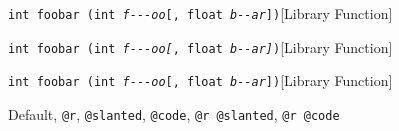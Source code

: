 \documentclass{book}
\begin{document}
%
\noindent\texttt{int foobar (int \textsl{f{-}{-}{-}oo}\texttt{[}, float \textsl{b{-}{-}ar}\texttt{]})}\hfill[Library Function]



%
\noindent\texttt{int foobar (int \textsl{f{-}{-}{-}oo}\textnormal{\textsl{[}}, float \textsl{b{-}{-}ar}\textnormal{\textsl{]}})}\hfill[Library Function]



%
\noindent\texttt{int foobar (int \textsl{f{-}{-}{-}oo}\textnormal{\texttt{[}}, float \textsl{b{-}{-}ar}\textnormal{\texttt{]}})}\hfill[Library Function]



%
Default, \texttt{@r}, \texttt{@slanted}, \texttt{@code}, \texttt{@r @slanted},
\texttt{@r @code}
\end{document}
